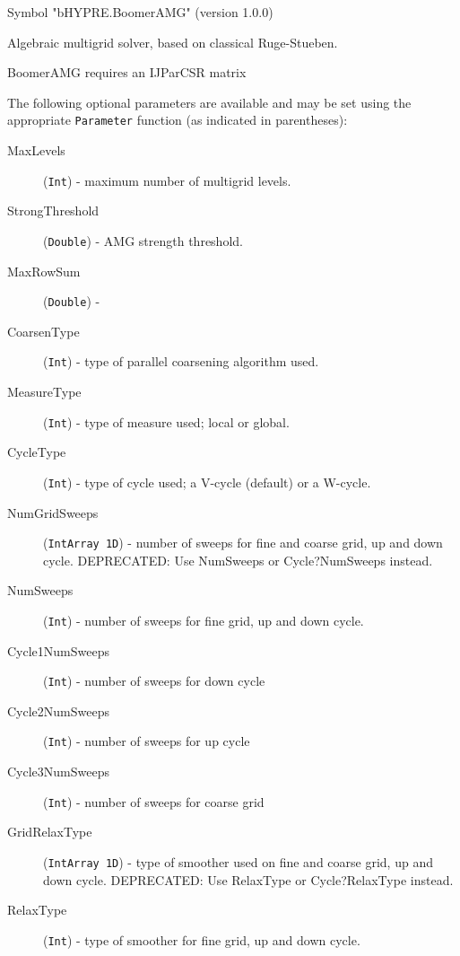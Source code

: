 \documentclass{article}
\begin{document}
\begin{cxxentry}
\begin{cxxentry}
\begin{cxxvariable}
\begin{cxxdoc}
Symbol "bHYPRE.BoomerAMG" (version 1.0.0)

Algebraic multigrid solver, based on classical Ruge-Stueben.

BoomerAMG requires an IJParCSR matrix

The following optional parameters are available and may be set
using the appropriate {\tt Parameter} function (as indicated in
parentheses):

\begin{description}

\item[MaxLevels] ({\tt Int}) - maximum number of multigrid
levels.

\item[StrongThreshold] ({\tt Double}) - AMG strength threshold.

\item[MaxRowSum] ({\tt Double}) -

\item[CoarsenType] ({\tt Int}) - type of parallel coarsening
algorithm used.

\item[MeasureType] ({\tt Int}) - type of measure used; local or
global.

\item[CycleType] ({\tt Int}) - type of cycle used; a V-cycle
(default) or a W-cycle.

\item[NumGridSweeps] ({\tt IntArray 1D}) - number of sweeps for
fine and coarse grid, up and down cycle. DEPRECATED:
Use NumSweeps or Cycle?NumSweeps instead.

\item[NumSweeps] ({\tt Int}) - number of sweeps for fine grid, up and
down cycle.

\item[Cycle1NumSweeps] ({\tt Int}) - number of sweeps for down cycle

\item[Cycle2NumSweeps] ({\tt Int}) - number of sweeps for up cycle

\item[Cycle3NumSweeps] ({\tt Int}) - number of sweeps for coarse grid

\item[GridRelaxType] ({\tt IntArray 1D}) - type of smoother used on
fine and coarse grid, up and down cycle. DEPRECATED:
Use RelaxType or Cycle?RelaxType instead.

\item[RelaxType] ({\tt Int}) - type of smoother for fine grid, up and
down cycle.


\end{description}
\end{cxxdoc}
\end{cxxvariable}
\end{cxxentry}
\end{cxxentry}
\end{document}
